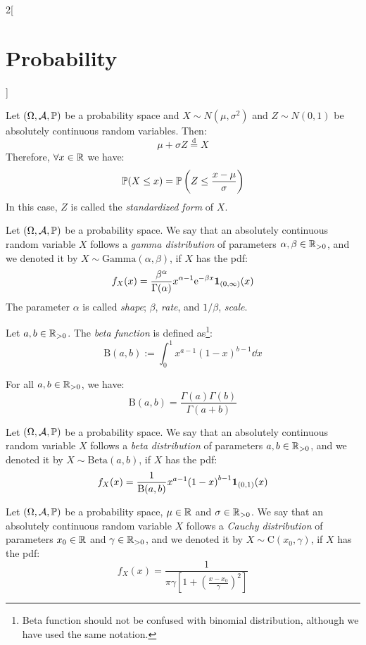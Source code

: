 \documentclass[../../../main_math.tex]{subfiles}
\begin{document}
\begin{multicols}{2}[\section{Probability}]
\begin{center}
\begin{minipage}{\linewidth}
      \centering
      
    \end{minipage}
  \end{center}
  \begin{proposition}
    Let $(\Omega,\mathcal{A},\mathbb{P})$ be a probability space and $X\sim N(\mu,\sigma^2)$ and $Z\sim N(0,1)$ be absolutely continuous random variables. Then: $$\mu+\sigma Z\overset{\text{d}}{=} X$$ Therefore, $\forall x\in\mathbb{R}$ we have: $$\mathbb{P}(X\leq x)=\mathbb{P}\left(Z\leq\frac{x-\mu}{\sigma}\right)$$ In this case, $Z$ is called the \emph{standardized form} of $X$.
  \end{proposition}
  \begin{definition}
    Let $(\Omega,\mathcal{A},\mathbb{P})$ be a probability space. We say that an absolutely continuous random variable $X$ follows a \emph{gamma distribution} of parameters $\alpha,\beta\in\mathbb{R}_{>0}$, and we denoted it by $X\sim \text{Gamma}(\alpha,\beta)$, if $X$ has the pdf: $$f_X(x)=\frac{\beta^\alpha}{\Gamma(\alpha)}x^{\alpha-1}\mathrm{e}^{-\beta x}\boldsymbol{\mathrm{1}}_{(0,\infty)}(x)$$
    The parameter $\alpha$ is called \emph{shape}; $\beta$, \emph{rate}, and $1/\beta$, \emph{scale}.
  \end{definition}
  \begin{definition}
    Let $a,b\in\mathbb{R}_{>0}$. The \emph{beta function} is defined as\footnote{Beta function should not be confused with binomial distribution, although we have used the same notation.}: $$\text{B}(a,b):=\int_0^1x^{a-1}{(1-x)}^{b-1}\dd{x}$$
  \end{definition}
  \begin{proposition}
    For all $a,b\in\mathbb{R}_{>0}$, we have: $$\text{B}(a,b)=\frac{\Gamma(a)\Gamma(b)}{\Gamma(a+b)}$$
  \end{proposition}
  \begin{definition}
    Let $(\Omega,\mathcal{A},\mathbb{P})$ be a probability space. We say that an absolutely continuous random variable $X$ follows a \emph{beta distribution} of parameters $a,b\in\mathbb{R}_{>0}$, and we denoted it by $X\sim \text{Beta}(a,b)$, if $X$ has the pdf: $$f_X(x)=\frac{1}{\text{B}(a,b)}x^{a-1}{(1-x)}^{b-1}\boldsymbol{\mathrm{1}}_{(0,1)}(x)$$
  \end{definition}
  \begin{definition}
    Let $(\Omega,\mathcal{A},\mathbb{P})$ be a probability space, $\mu\in\mathbb{R}$ and $\sigma\in\mathbb{R}_{>0}$. We say that an absolutely continuous random variable $X$ follows a \emph{Cauchy distribution} of parameters $x_0\in\mathbb{R}$ and $\gamma\in\mathbb{R}_{>0}$, and we denoted it by $X\sim \text{C}(x_0,\gamma)$, if $X$ has the pdf: $$f_X(x)=\frac{1}{\pi\gamma\left[1+{\left(\frac{x-x_0}{\gamma}\right)}^2\right]}$$

\end{definition}
\end{multicols}
\end{document}
